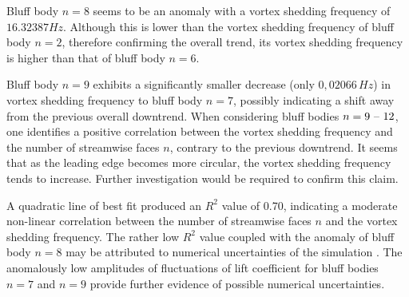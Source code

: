 Bluff body $n = 8$ seems to be an anomaly with a vortex shedding frequency of $16.32387 Hz$. Although this is lower than the vortex shedding frequency of bluff body $n = 2$, therefore confirming the overall trend, its vortex shedding frequency is higher than that of bluff body $n = 6$. 

Bluff body $n = 9$ exhibits a significantly smaller decrease (only $0,02066\, Hz$) in vortex shedding frequency to bluff body $n = 7$, possibly indicating a shift away from the previous overall downtrend. When considering bluff bodies $n = 9 \text{ \textendash\ } 12$, one identifies a positive correlation between the vortex shedding frequency and the number of streamwise faces $n$, contrary to the previous downtrend. It seems that as the leading edge becomes more circular, the vortex shedding frequency tends to increase. Further investigation would be required to confirm this claim.

A quadratic line of best fit produced an $R^2$ value of 0.70, indicating a moderate non-linear correlation between the number of streamwise faces $n$ and the vortex shedding frequency. The rather low $R^2$ value coupled with the anomaly of bluff body $n = 8$ may be attributed to numerical uncertainties of the simulation \parencite{city7565}. The anomalously low amplitudes of fluctuations of lift coefficient for bluff bodies $n = 7$ and $n = 9$ provide further evidence of possible numerical uncertainties.



